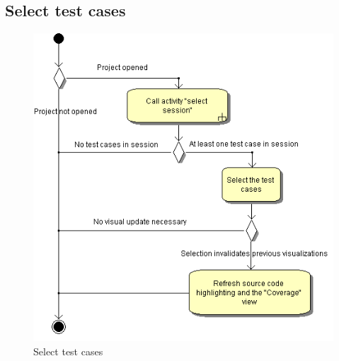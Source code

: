 \clearpage
\subsection{Select test cases}
\begin{figure}[htb]
 \centering
 \includegraphics[height=0.7\textheight]{images/Activities/select_test_cases.png}
 \caption{Select test cases}
 \label{ac_fg:select_test_cases}
\end{figure}

\clearpage
